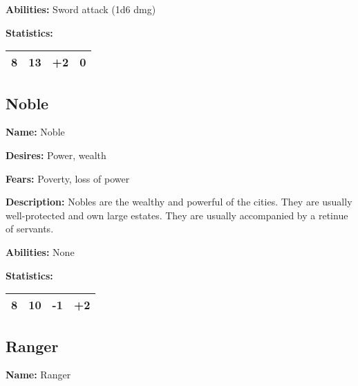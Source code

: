 \begin{multicols}{2}
\textbf{Abilities:} Sword attack (1d6 dmg)

\textbf{Statistics:}

\begin{center}
{
\begin{xtabular}{|l|l|l|l|}
8 & 13 & +2 & 0 \\
\hline
\end{xtabular}
}
\end{center}

\subsection{Noble}

\textbf{Name:} Noble

\textbf{Desires:} Power, wealth

\textbf{Fears:} Poverty, loss of power

\textbf{Description:} Nobles are the wealthy and powerful of the cities. They are usually
well-protected and own large estates. They are usually accompanied by a retinue of servants.

\textbf{Abilities:} None

\textbf{Statistics:}

\begin{center}
{
\begin{xtabular}{|l|l|l|l|}
8 & 10 & -1 & +2 \\
\hline
\end{xtabular}
}
\end{center}

\subsection{Ranger}

\textbf{Name:} Ranger


\end{multicols}
